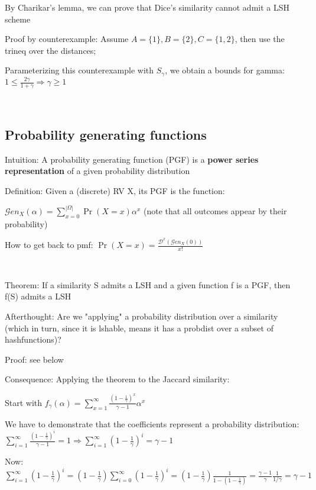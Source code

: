 \documentclass{report}
\begin{document}
	By Charikar's lemma, we can prove that Dice's similarity cannot admit a LSH scheme
	
	Proof by counterexample: Assume $A=\{1\}, B=\{2\}, C=\{1, 2\}$, then use the trineq over the distances; %
	
	Parameterizing this counterexample with $S_\gamma$, we obtain a bounds for gamma: $1 \leq \frac{2\gamma}{1 + \gamma} \Rightarrow \gamma \geq 1$
	
	\
	
	\subsection{Probability generating functions}
	
	Intuition: A probability generating function (PGF) is a \textbf{power series representation} of a given probability distribution
	
	Definition: Given a (discrete) RV X, its PGF is the function:
	
	$\displaystyle \mathcal{G}en_X(\alpha)= \sum_{x=0}^{|\Omega|}\Pr(X=x)\alpha^x$ (note that all outcomes appear by their probability)
	
	How to get back to pmf: $\displaystyle \Pr(X=x) = \frac{\mathcal{D}^x(\mathcal{G}en_X(0))}{x!}$
	
	\
	
	Theorem: If a similarity S admits a LSH and a given function f is a PGF, then f(S) admits a LSH
	
	Afterthought: Are we "applying" a probability distribution over a similarity (which in turn, since it is lshable, means it has a probdist over a subset of hashfunctions)?
	
	Proof: see below
	
	Consequence: Applying the theorem to the Jaccard similarity:
	
	
	Start with $\displaystyle f_\gamma(\alpha) = \sum_{x=1}^{\infty}\frac{(1-\frac{1}{\gamma})^x}{\gamma -1}\alpha^x$
	
	We have to demonstrate that the coefficients represent a probability distribution: $\displaystyle \sum_{i=1}^{\infty}\frac{(1-\frac{1}{\gamma})^i}{\gamma -1}=1 \Rightarrow \sum_{i=1}^{\infty}(1-\frac{1}{\gamma})^i=\gamma -1$
	
	Now: $\displaystyle \sum_{i=1}^{\infty}(1 - \frac{1}{\gamma})^i = (1 - \frac{1}{\gamma})\sum_{i=0}^{\infty}(1 - \frac{1}{\gamma})^i = (1 - \frac{1}{\gamma}) \frac{1}{1 - (1 - \frac{1}{\gamma})} = \frac{\gamma -1 }{\gamma}\frac{1}{1/\gamma} = \gamma -1$
	
\end{document}
